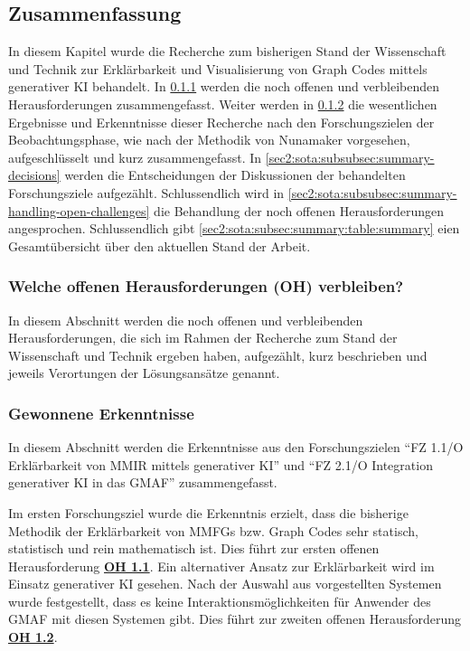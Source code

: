\clearpage

\subsection{Zusammenfassung}
\label{sec2:sota:subsec:summary}
In diesem Kapitel wurde die Recherche zum bisherigen Stand der Wissenschaft und Technik zur Erklärbarkeit und Visualisierung von Graph Codes mittels generativer KI behandelt.
In \cref{sec2:sota:subsubsec:summary-remaining-open-challenges} werden die noch offenen und verbleibenden Herausforderungen zusammengefasst.
Weiter werden in \cref{sec2:sota:subsubsec:summary-findings} die wesentlichen Ergebnisse und Erkenntnisse dieser Recherche nach den Forschungszielen der Beobachtungsphase, wie nach der Methodik von Nunamaker vorgesehen, aufgeschlüsselt und kurz zusammengefasst.
In \cref{sec2:sota:subsubsec:summary-decisions} werden die Entscheidungen der Diskussionen der behandelten Forschungsziele aufgezählt.
Schlussendlich wird in \cref{sec2:sota:subsubsec:summary-handling-open-challenges} die Behandlung der noch offenen Herausforderungen angesprochen.
Schlussendlich gibt \cref{sec2:sota:subsec:summary:table:summary} eien Gesamtübersicht über den aktuellen Stand der Arbeit.

\subsubsection{Welche offenen Herausforderungen (OH) verbleiben?}
\label{sec2:sota:subsubsec:summary-remaining-open-challenges}
In diesem Abschnitt werden die noch offenen und verbleibenden Herausforderungen, die sich im Rahmen der Recherche zum Stand der Wissenschaft und Technik ergeben haben, aufgezählt, kurz beschrieben und jeweils Verortungen der Lösungsansätze genannt.



\subsubsection{Gewonnene Erkenntnisse}
\label{sec2:sota:subsubsec:summary-findings}
In diesem Abschnitt werden die Erkenntnisse aus den Forschungszielen \enquote{FZ 1.1/O Erklärbarkeit von MMIR mittels generativer KI} und \enquote{FZ 2.1/O Integration generativer KI in das GMAF} zusammengefasst.

Im ersten Forschungsziel wurde die Erkenntnis erzielt, dass die bisherige Methodik der Erklärbarkeit von MMFGs bzw. Graph Codes sehr statisch, statistisch und rein mathematisch ist.
Dies führt zur ersten offenen Herausforderung \hyperref[sec2:sota:oi:1.1]{\textbf{OH 1.1}}.
Ein alternativer Ansatz zur Erklärbarkeit wird im Einsatz generativer KI gesehen.
Nach der Auswahl aus vorgestellten Systemen wurde festgestellt, dass es keine Interaktionsmöglichkeiten für Anwender des GMAF mit diesen Systemen gibt.
Dies führt zur zweiten offenen Herausforderung \hyperref[sec2:sota:oi:1.2]{\textbf{OH 1.2}}.

